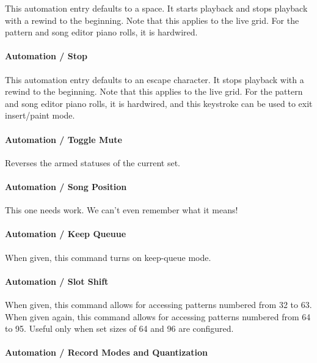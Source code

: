    This automation entry defaults to a space.
   It starts playback and stops playback with a rewind to the beginning.
   Note that this applies to the live grid.
   For the pattern and song editor piano rolls, it is hardwired.

\paragraph{Automation / Stop}
\label{paragraph:configuration_stop}

   This automation entry defaults to an escape character.
   It stops playback with a rewind to the beginning.
   Note that this applies to the live grid.
   For the pattern and song editor piano rolls, it is hardwired,
   and this keystroke can be used to exit insert/paint mode.

\paragraph{Automation / Toggle Mute}
\label{paragraph:configuration_toggle_mute}

   Reverses the armed statuses of the current set.

\paragraph{Automation / Song Position}
\label{paragraph:configuration_song_position}

   This one needs work. We can't even remember what it means!

\paragraph{Automation / Keep Queuue}
\label{paragraph:configuration_keep_queue}

   When given, this command turns on keep-queue mode.

\paragraph{Automation / Slot Shift}
\label{paragraph:configuration_slot_shift}

   When given, this command allows for accessing patterns numbered
   from 32 to 63.
   When given again, this command allows for accessing patterns numbered
   from 64 to 95.
   Useful only when set sizes of 64 and 96 are configured.

\paragraph{Automation / Record Modes and Quantization}
\label{paragraph:configuration_midi_record_quan}

